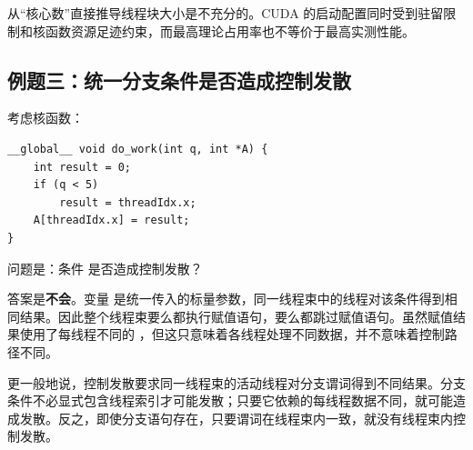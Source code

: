 \begin{keybox}
从“核心数”直接推导线程块大小是不充分的。CUDA 的启动配置同时受到驻留限制和核函数资源足迹约束，而最高理论占用率也不等价于最高实测性能。
\end{keybox}

\subsection{例题三：统一分支条件是否造成控制发散}

\par\noindent\begin{minipage}{\linewidth}
考虑核函数：

\begin{lstlisting}[caption={统一分支条件的核函数}]
__global__ void do_work(int q, int *A) {
    int result = 0;
    if (q < 5)
        result = threadIdx.x;
    A[threadIdx.x] = result;
}
\end{lstlisting}
\end{minipage}\par

问题是：条件  是否造成控制发散？

答案是\textbf{不会}。变量  是统一传入的标量参数，同一线程束中的线程对该条件得到相同结果。因此整个线程束要么都执行赋值语句，要么都跳过赋值语句。虽然赋值结果使用了每线程不同的 ，但这只意味着各线程处理不同数据，并不意味着控制路径不同。

更一般地说，控制发散要求同一线程束的活动线程对分支谓词得到不同结果。分支条件不必显式包含线程索引才可能发散；只要它依赖的每线程数据不同，就可能造成发散。反之，即使分支语句存在，只要谓词在线程束内一致，就没有线程束内控制发散。

